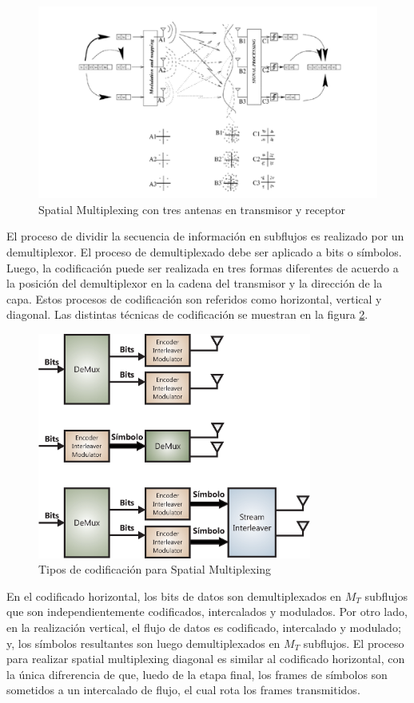 \begin{figure}[htb!]
        \centering
        \includegraphics[width=13cm]{./figures/C02-spatial_multi_1}
        \caption{Spatial Multiplexing con tres antenas en transmisor y receptor}
        \label{fig:spatial_multi1}
\end{figure}

El proceso de dividir la secuencia de información en subflujos es realizado por un demultiplexor. El proceso de demultiplexado debe ser aplicado a bits o símbolos. Luego, la codificación puede ser realizada en tres formas diferentes de acuerdo a la posición del demultiplexor en la cadena del transmisor y la dirección de la capa. Estos procesos de codificación son referidos como horizontal, vertical y diagonal. Las distintas técnicas de codificación se muestran en la figura \ref{fig:spatial_multi2}.

\begin{figure}[htb!]
        \centering
        \includegraphics[width=9cm]{./figures/C02-spatial_multi2}
        \caption{Tipos de codificación para Spatial Multiplexing}
        \label{fig:spatial_multi2}
\end{figure}

\newpage

En el codificado horizontal, los bits de datos son demultiplexados en $M_T$ subflujos que son independientemente codificados, intercalados y modulados. Por otro lado, en la realización vertical, el flujo de datos es codificado, intercalado y modulado; y, los símbolos resultantes son luego demultiplexados en $M_T$ subflujos. El proceso para realizar spatial multiplexing diagonal es similar al codificado horizontal, con la única difrerencia de que, luedo de la etapa final, los frames de símbolos son sometidos a un intercalado de flujo, el cual rota los frames transmitidos.